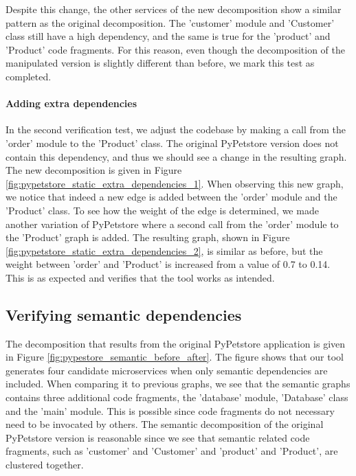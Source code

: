 Despite this change, the other services of the new decomposition show a similar pattern as the original decomposition. The 'customer' module and 'Customer' class still have a high dependency, and the same is true for the 'product' and 'Product' code fragments. For this reason, even though the decomposition of the manipulated version is slightly different than before, we mark this test as completed. \par





\paragraph{Adding extra dependencies}
In the second verification test, we adjust the codebase by making a call from the 'order' module to the 'Product' class. The original PyPetstore version does not contain this dependency, and thus we should see a change in the resulting graph. The new decomposition is given in Figure \ref{fig:pypetstore_static_extra_dependencies_1}. When observing this new graph, we notice that indeed a new edge is added between the 'order' module and the 'Product' class. To see how the weight of the edge is determined, we made another variation of PyPetstore where a second call from the 'order' module to the 'Product' graph is added. The resulting graph, shown in Figure \ref{fig:pypetstore_static_extra_dependencies_2}, is similar as before, but the weight between 'order' and 'Product' is increased from a value of 0.7 to 0.14. This is as expected and verifies that the tool works as intended.

\subsection{Verifying semantic dependencies}
The decomposition that results from the original PyPetstore application is given in Figure \ref{fig:pypestore_semantic_before_after}. The figure shows that our tool generates four candidate microservices when only semantic dependencies are included. When comparing it to previous graphs, we see that the semantic graphs contains three additional code fragments, the 'database' module, 'Database' class and the 'main' module. This is possible since code fragments do not necessary need to be invocated by others. The semantic decomposition of the original PyPetstore version is reasonable since we see that semantic related code fragments, such as 'customer' and 'Customer' and 'product' and 'Product', are clustered together. 

